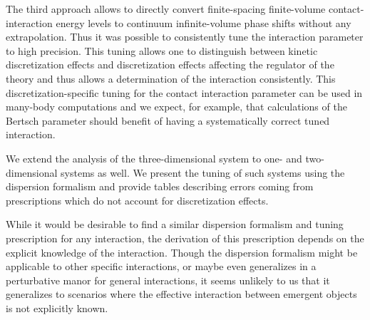 The third approach allows to directly convert finite-spacing finite-volume contact-interaction energy levels to continuum infinite-volume phase shifts without any extrapolation.
Thus it was possible to consistently tune the interaction parameter to high precision.
This tuning allows one to distinguish between kinetic discretization effects and discretization effects affecting the regulator of the theory and thus allows a determination of the interaction consistently.
This discretization-specific tuning for the contact interaction parameter can be used in many-body computations and we expect, for example, that calculations of the Bertsch parameter should benefit of having a systematically correct tuned interaction.

We extend the analysis of the three-dimensional system to one- and two-dimensional systems as well.
We present the tuning of such systems using the dispersion formalism and provide tables describing errors coming from prescriptions which do not account for discretization effects.

While it would be desirable to find a similar dispersion formalism and tuning prescription for any interaction, the derivation of this prescription depends on the explicit knowledge of the interaction.
Though the dispersion formalism might be applicable to other specific interactions, or maybe even generalizes in a perturbative manor for general interactions, it seems unlikely to us that it generalizes to scenarios where the effective interaction between emergent objects is not explicitly known.


